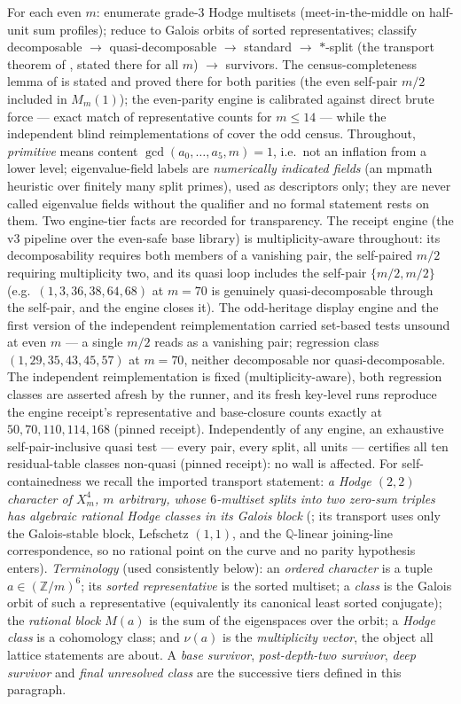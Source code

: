 \documentclass[11pt]{amsart}
\theoremstyle{remark}
\newcommand{\Q}{\mathbb{Q}}
\newcommand{\Z}{\mathbb{Z}}
\begin{document}
For each even $m$: enumerate grade-$3$ Hodge multisets (meet-in-the-middle on half-unit sum
profiles); reduce to Galois orbits of sorted representatives; classify
decomposable $\to$ quasi-decomposable $\to$ standard $\to$ $*$-split (the transport theorem of
\cite{BN}, stated there for all $m$) $\to$ survivors. The
census-completeness lemma of \cite{BN} is stated and proved there for both parities (the even
self-pair $m/2$ included in $M_m(1)$); the even-parity engine is calibrated against direct brute
force --- exact match of representative counts for $m\le14$ --- while the independent blind
reimplementations of \cite{BN} cover the odd census.
Throughout, \emph{primitive} means content $\gcd(a_0,\dots,a_5,m)=1$, i.e.\ not an inflation
from a lower level; eigenvalue-field labels are \emph{numerically indicated fields} (an mpmath heuristic over
finitely many split primes), used as descriptors only; they are never called eigenvalue fields
without the qualifier and no formal statement rests on them. Two engine-tier facts are recorded for transparency. The receipt engine (the v3
pipeline over the even-safe base library) is multiplicity-aware throughout: its decomposability
requires both members of a vanishing pair, the self-paired $m/2$ requiring multiplicity two, and
its quasi loop includes the self-pair $\{m/2,m/2\}$ (e.g.\ $(1,3,36,38,64,68)$ at $m=70$ is
genuinely quasi-decomposable through the self-pair, and the engine closes it). The odd-heritage
display engine and the first version of the independent reimplementation carried set-based tests
unsound at even $m$ --- a single $m/2$ reads as a vanishing pair; regression class
$(1,29,35,43,45,57)$ at $m=70$, neither decomposable nor quasi-decomposable. The independent
reimplementation is fixed (multiplicity-aware), both regression classes are asserted afresh by
the runner, and its fresh key-level runs reproduce the engine receipt's representative and
base-closure counts exactly at $50,70,110,114,168$ (pinned receipt). Independently of any
engine, an exhaustive self-pair-inclusive quasi test --- every pair, every split, all units ---
certifies all ten residual-table classes non-quasi (pinned receipt): no wall is affected. For
self-containedness we recall the imported transport statement: \emph{a Hodge $(2,2)$ character
of $X^4_m$, $m$ arbitrary, whose $6$-multiset splits into two zero-sum triples has algebraic
rational Hodge classes in its Galois block} (\cite[Thm.~A]{BN}; its transport uses only the
Galois-stable block, Lefschetz $(1,1)$, and the $\Q$-linear joining-line correspondence, so no
rational point on the curve and no parity hypothesis enters). \emph{Terminology} (used consistently below): an \emph{ordered character} is a tuple
$a\in(\Z/m)^6$; its \emph{sorted representative} is the sorted multiset; a \emph{class} is the
Galois orbit of such a representative (equivalently its canonical least sorted conjugate); the
\emph{rational block} $M(a)$ is the sum of the eigenspaces over the orbit; a \emph{Hodge class}
is a cohomology class; and $\nu(a)$ is the \emph{multiplicity vector}, the object all lattice
statements are about. A \emph{base survivor}, \emph{post-depth-two survivor}, \emph{deep
survivor} and \emph{final unresolved class} are the successive tiers defined in this paragraph.
\end{document}

